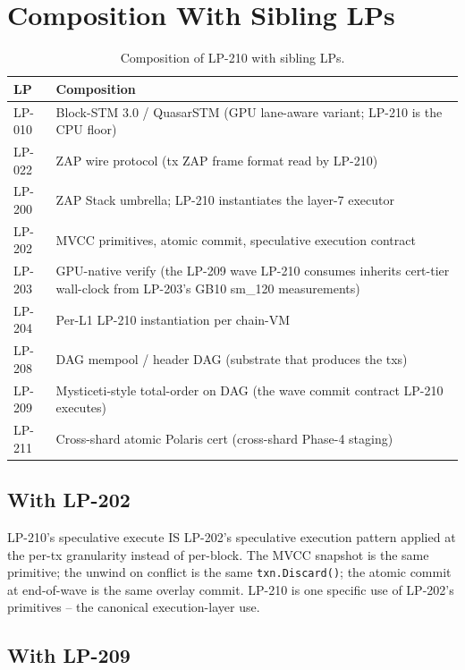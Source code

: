 \section{Composition With Sibling LPs}

\begin{table}[h]
\centering
\small
\begin{tabular}{@{}lp{9cm}@{}}
\toprule
\textbf{LP} & \textbf{Composition} \\
\midrule
LP-010 & Block-STM 3.0 / QuasarSTM (GPU lane-aware variant; LP-210 is the CPU floor) \\
LP-022 & ZAP wire protocol (tx ZAP frame format read by LP-210) \\
LP-200 & ZAP Stack umbrella; LP-210 instantiates the layer-7 executor \\
LP-202 & MVCC primitives, atomic commit, speculative execution contract \\
LP-203 & GPU-native verify (the LP-209 wave LP-210 consumes inherits cert-tier wall-clock from LP-203's GB10 sm\_120 measurements) \\
LP-204 & Per-L1 LP-210 instantiation per chain-VM \\
LP-208 & DAG mempool / header DAG (substrate that produces the txs) \\
LP-209 & Mysticeti-style total-order on DAG (the wave commit contract LP-210 executes) \\
LP-211 & Cross-shard atomic Polaris cert (cross-shard Phase-4 staging) \\
\bottomrule
\end{tabular}
\caption{Composition of LP-210 with sibling LPs.}
\label{tab:composition}
\end{table}

\subsection{With LP-202}

LP-210's speculative execute IS LP-202's speculative execution
pattern applied at the per-tx granularity instead of per-block. The
MVCC snapshot is the same primitive; the unwind on conflict is the
same \texttt{txn.Discard()}; the atomic commit at end-of-wave is the
same overlay commit. LP-210 is one specific use of LP-202's
primitives -- the canonical execution-layer use.

\subsection{With LP-209}

